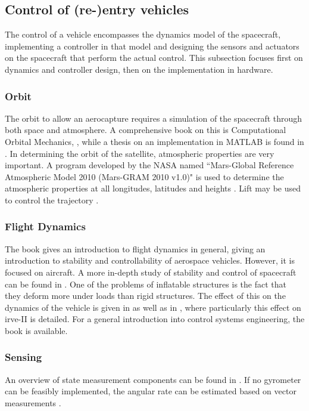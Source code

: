 \subsection{Control of (re-)entry vehicles} \label{sec:control}
The control of a vehicle encompasses the dynamics model of the spacecraft, implementing a controller in that model and designing the sensors and actuators on the spacecraft that perform the actual control. This subsection focuses first on dynamics and controller design, then on the implementation in hardware.

\subsubsection{Orbit}
The orbit to allow an aerocapture requires a simulation of the spacecraft through both space and atmosphere. A comprehensive book on this is Computational Orbital Mechanics, \cite{Weiland2004}, while a thesis on an implementation in MATLAB is found in \cite{Leszczynski1998}. In determining the orbit of the satellite, atmospheric properties are very important. A program developed by the NASA named ``Mars-Global Reference Atmospheric Model 2010 (Mars-GRAM 2010 v1.0)" is used to determine the atmospheric properties at all longitudes, latitudes and heights \cite{Justus2001}. Lift may be used to control the trajectory \cite{Esmaelzadeh2010}.

\subsubsection{Flight Dynamics}
The book \cite{Mulder2013} gives an introduction to flight dynamics in general, giving an introduction to stability and controllability of aerospace vehicles. However, it is focused on aircraft. A more in-depth study of stability and control of spacecraft can be found in \cite{Steketee1967, Ito2002}. One of the problems of inflatable structures is the fact that they deform more under loads than rigid structures. The effect of this on the dynamics of the vehicle is given in \cite{Axdahl2009} as well as in \cite{Bose2009}, where particularly this effect on \gls{irve}-II is detailed. For a general introduction into control systems engineering, the book \cite{Nise2011} is available.

\subsubsection{Sensing}
An overview of state measurement components can be found in \cite{Wertz2011}. If no gyrometer can be feasibly implemented, the angular rate can be estimated based on vector measurements \cite{Azor1998}.

